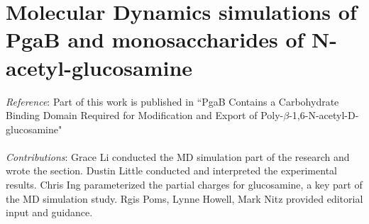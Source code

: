 % 


\chapter[MD simulations of PgaB-glucosamine binding]{Molecular Dynamics simulations of PgaB and monosaccharides of N-acetyl-glucosamine}

\emph{Reference}: Part of this work is published in ``PgaB Contains a Carbohydrate Binding Domain Required for Modification and Export of Poly-$\beta$-1,6-N-acetyl-D-glucosamine"
\\
\\
\emph{Contributions}:
Grace Li conducted the MD simulation part of the research and wrote the section. Dustin Little conducted and interpreted the experimental results. Chris Ing parameterized the partial charges for glucosamine, a key part of the MD simulation study. Rgis Poms, Lynne Howell, Mark Nitz provided editorial input and guidance.

\newpage

